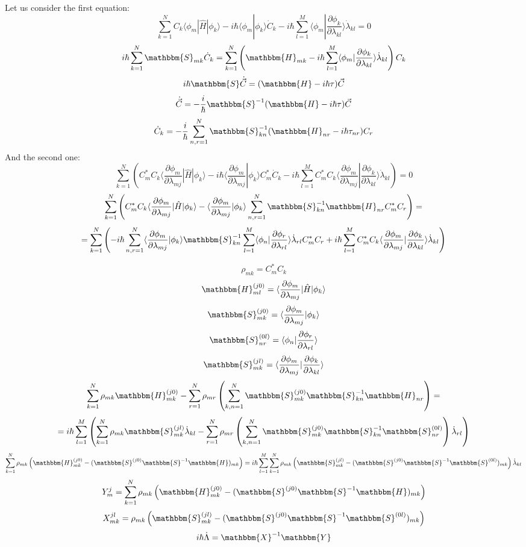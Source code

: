 \documentclass[a4paper,14pt]{extarticle}
\begin{document}
Let us consider the first equation:
$$\sum_{k=1}^N C_k\langle\phi_m|\hat{H}|\phi_k\rangle - %
	       i\hbar\langle\phi_m|\phi_k\rangle \dot{C}_k - %
	       i\hbar\sum_{l=1}^M\langle\phi_m|\frac{\partial\phi_k}{\partial\lambda_{kl}}\rangle\dot{\lambda}_{kl}=0$$
$$i\hbar\sum_{k=1}^N\mathbbm{S}_{mk}\dot{C}_k=\sum_{k=1}^N\left(\mathbbm{H}_{mk}-%
							  i\hbar\sum_{l=1}^M\langle\phi_m|\frac{\partial\phi_k}{\partial\lambda_{kl}}\rangle\dot{\lambda}_{kl}\right)C_k$$
$$i\hbar\mathbbm{S}\dot{\vec{C}}=(\mathbbm{H}-i\hbar\tau)\vec{C}$$
$$\dot{\vec{C}} = -\frac{i}{\hbar}\mathbbm{S}^{-1}(\mathbbm{H}-i\hbar\tau)\vec{C}$$
$$\dot{C}_k = -\frac{i}{\hbar}\sum_{n,r=1}^N \mathbbm{S}^{-1}_{kn}(\mathbbm{H}_{nr}-i\hbar\tau_{nr})C_r$$
And the second one:
$$\sum_{k=1}^N\left(C_m^*C_k\langle\frac{\partial\phi_m}{\partial\lambda_{mj}}|\hat{H}|\phi_k\rangle-%
	     i\hbar\langle\frac{\partial\phi_m}{\partial\lambda_{mj}}|\phi_k\rangle C_m^*\dot{C}_k-%
	     i\hbar\sum_{l=1}^MC_m^*C_k\langle\frac{\partial\phi_m}{\partial\lambda_{mj}}|\frac{\partial\phi_k}{\partial\lambda_{kl}}\rangle\dot{\lambda}_{kl}\right)=0$$
$$\sum_{k=1}^N\left(C_m^*C_k\langle\frac{\partial\phi_m}{\partial\lambda_{mj}}|\hat{H}|\phi_k\rangle-%
		    \langle\frac{\partial\phi_m}{\partial\lambda_{mj}}|\phi_k\rangle\sum_{n,r=1}^N\mathbbm{S}^{-1}_{kn}\mathbbm{H}_{nr}C_m^*C_r\right)=$$
$$= \sum_{k=1}^N\left(-i\hbar\sum_{n,r=1}^N\langle\frac{\partial\phi_m}{\partial\lambda_{mj}}|\phi_k\rangle\mathbbm{S}_{kn}^{-1}%
		             \sum_{l=1}^M\langle\phi_n|\frac{\partial\phi_r}{\partial\lambda_{rl}}\rangle\dot{\lambda}_{rl}C_m^*C_r+%
     		       i\hbar\sum_{l=1}^MC_m^*C_k\langle\frac{\partial\phi_m}{\partial\lambda_{mj}}|\frac{\partial\phi_k}{\partial\lambda_{kl}}\rangle\dot{\lambda}_{kl}\right)$$

$$\rho_{mk} = C_m^*C_k$$
$$\mathbbm{H}_{ml}^{(j0)}=\langle\frac{\partial\phi_m}{\partial\lambda_{mj}}|\hat{H}|\phi_k\rangle$$
$$\mathbbm{S}_{mk}^{(j0)}=\langle\frac{\partial\phi_m}{\partial\lambda_{mj}}|\phi_k\rangle$$
$$\mathbbm{S}_{nr}^{(0l)}=\langle\phi_n|\frac{\partial\phi_r}{\partial\lambda_{rl}}\rangle$$
$$\mathbbm{S}_{mk}^{(jl)}=\langle\frac{\partial\phi_m}{\partial\lambda_{mj}}|%
				 \frac{\partial\phi_k}{\partial\lambda_{kl}}\rangle$$
$$\sum_{k=1}^N\rho_{mk}\mathbbm{H}_{mk}^{(j0)}-%
  \sum_{r=1}^N\rho_{mr}\left(\sum_{k,n=1}^N\mathbbm{S}_{mk}^{(j0)}\mathbbm{S}_{kn}^{-1}\mathbbm{H}_{nr}\right)=$$
$$=i\hbar\sum_{l=1}^M\left(\sum_{k=1}^N\rho_{mk}\mathbbm{S}_{mk}^{(jl)}\dot{\lambda}_{kl}-%
\sum_{r=1}^N\rho_{mr}\left(\sum_{k,n=1}^{N}\mathbbm{S}_{mk}^{(j0)}\mathbbm{S}_{kn}^{-1}\mathbbm{S}_{nr}^{(0l)}\right)\dot{\lambda}_{rl}\right)$$
$$\sum_{k=1}^N\rho_{mk}\left(\mathbbm{H}_{mk}^{(j0)}-%
	                     (\mathbbm{S}^{(j0)}\mathbbm{S}^{-1}\mathbbm{H})_{mk} \right)=%
i\hbar\sum_{l=1}^M\sum_{k=1}^N\rho_{mk}\left(\mathbbm{S}_{mk}^{(jl)}-%
					     (\mathbbm{S}^{(j0)}\mathbbm{S}^{-1}\mathbbm{S}^{(0l)})_{mk}\right)\dot{\lambda}_{kl}$$
$$Y_{m}^j=\sum_{k=1}^N\rho_{mk}\left(\mathbbm{H}_{mk}^{(j0)}-%
	                     (\mathbbm{S}^{(j0)}\mathbbm{S}^{-1}\mathbbm{H})_{mk} \right)$$
$$X_{mk}^{jl}=\rho_{mk}\left(\mathbbm{S}_{mk}^{(jl)}-%
					     (\mathbbm{S}^{(j0)}\mathbbm{S}^{-1}\mathbbm{S}^{(0l)})_{mk}\right)$$
$$i\hbar\dot{\Lambda} = \mathbbm{X}^{-1}\mathbbm{Y}$$
\end{document}

